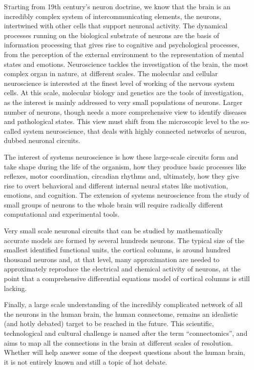\lettrine{S}{t}arting from 19th century’s neuron doctrine, we know that the brain is an incredibly complex system of intercommunicating elements, the neurons, intertwined with other cells that support neuronal activity. 
The dynamical processes running on the biological substrate of neurons are the basis of information processing that gives rise to cognitive and psychological processes, from the perception of the external environment to the representation of mental states and emotions.
Neuroscience tackles the investigation of the brain, the most complex organ in nature, at different scales. The molecular and cellular neuroscience is interested at the finest level of working of the nervous system cells. At this scale, molecular biology and genetics are the tools of investigation, as the interest is mainly addressed to very small populations of neurons. 
Larger number of neurons, though needs a more comprehensive view to identify diseases and pathological states. This view must shift from the microscopic level to the so-called system neuroscience, that deals with highly connected networks of neuron, dubbed neuronal circuits.

The interest of systems neuroscience is how these large-scale circuits form and take shape during the life of the organism, how they produce basic processes like reflexes, motor coordination, circadian rhythms and, ultimately, how they give rise to overt behavioral and different internal neural states like motivation, emotions, and cognition.
The extension of systems neuroscience from the study of small groups of neurons to the whole brain will require radically different computational and experimental tools.

Very small scale neuronal circuits that can be studied by mathematically accurate models are formed by several hundreds neurons. The typical size of the smallest identified functional units, the cortical columns, is around hundred thousand neurons and, at that level, many approximation are needed to approximately reproduce the electrical and chemical activity of neurons, at the point that a comprehensive differential equations model of cortical columns is still lacking. 

Finally, a large scale understanding of the incredibly complicated network of all the neurons in the human brain, the human connectome, remains an idealistic (and hotly debated) target to be reached in the future. This scientific, technological and cultural challenge is named after the term ``connectomics'', and aims to map all the connections in the brain at different scales of resolution. Whether will help answer some of the deepest questions about the human brain, it is not entirely known and still a topic of hot debate.

